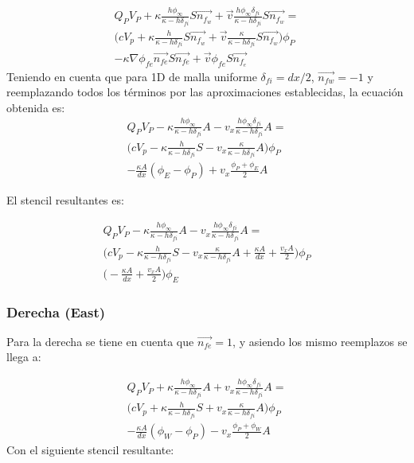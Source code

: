 \documentclass{article}
\begin{document}
    \begin{multline*}
        Q_P V_P + \kappa \frac{h \phi_{\infty}} {\kappa - h \delta_{fi}} S \vec{n_{f_w}} + \vec{v}  \frac{h \phi_{\infty} \delta_{fi}}{\kappa - h \delta_{fi}} S \vec{n_{f_w}} =  \\
        \big( c V_p + \kappa  \frac{h }  {\kappa - h \delta_{fi}} S \vec{n_{f_w}} + \vec{v} \frac{\kappa} {\kappa - h \delta_{fi}} S \vec{n_{f_w}} \big) \phi_P  \\
        - \kappa \nabla \phi_{fe} \vec{n_{fe}} S \vec{n_{fe}} + \vec{v}\phi_{fe} S \vec{n_{f_e}}
    \end{multline*} 
   Teniendo en cuenta que para 1D de malla uniforme $\delta_{fi} = dx/2$, $\vec{n_{fw}} = -1$ y reemplazando todos los términos por las aproximaciones establecidas, la ecuación obtenida es:
   \begin{multline*}
        Q_P V_P - \kappa \frac{h \phi_{\infty}} {\kappa - h \delta_{fi}} A - v_x  \frac{h \phi_{\infty} \delta_{fi}}{\kappa - h \delta_{fi}} A  =  \\
        \big( c V_p - \kappa  \frac{h}  {\kappa - h \delta_{fi}} S - v_x \frac{\kappa} {\kappa - h \delta_{fi}} A \big) \phi_P  \\
        - \frac{\kappa A}{dx} \left( \phi_E - \phi_P \right) + v_x \frac{\phi_P +  \phi_E}{2} A
    \end{multline*}
    
    El stencil resultantes es:
    
    \begin{multline}
        Q_P V_P - \kappa \frac{h \phi_{\infty}} {\kappa - h \delta_{fi}} A - v_x  \frac{h \phi_{\infty} \delta_{fi}}{\kappa - h \delta_{fi}} A  =  \\
        \big( c V_p - \kappa  \frac{h}  {\kappa - h \delta_{fi}} S - v_x \frac{\kappa} {\kappa - h \delta_{fi}} A + \frac{\kappa A}{dx} + \frac{v_x A}{2} \big) \phi_P  \\
        \big( - \frac{\kappa A}{dx} + \frac{v_x A}{2} \big) \phi_E
        \label{eq:stencilRobW}
    \end{multline} 
  \subsubsection{Derecha (East)}
    Para la derecha se tiene en cuenta que $\vec{n_{fe}} = 1$, y asiendo los mismo reemplazos se llega a:
    
    \begin{multline*}
        Q_P V_P + \kappa \frac{h \phi_{\infty}} {\kappa - h \delta_{fi}} A + v_x  \frac{h \phi_{\infty} \delta_{fi}}{\kappa - h \delta_{fi}} A  =  \\
        \big( c V_p + \kappa  \frac{h}  {\kappa - h \delta_{fi}} S + v_x \frac{\kappa} {\kappa - h \delta_{fi}} A \big) \phi_P  \\
        - \frac{\kappa A}{dx} \left( \phi_W - \phi_P \right) - v_x \frac{\phi_P +  \phi_W}{2} A
    \end{multline*}
    Con el siguiente stencil resultante:
    
\end{document}
